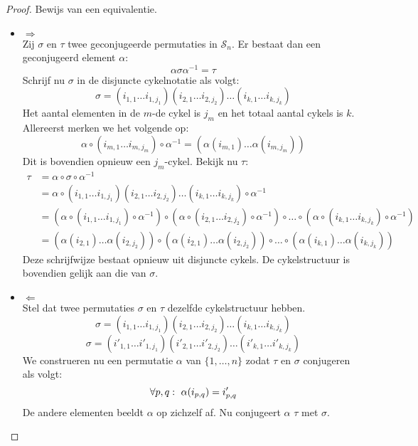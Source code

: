 \documentclass[main.tex]{subfiles}
\begin{document}
\begin{ei}
  \begin{proof}
    Bewijs van een equivalentie.
    \begin{itemize}
    \item $\Rightarrow$\\
      Zij $\sigma$ en $\tau$ twee geconjugeerde permutaties in $\mathcal{S}_{n}$.
      Er bestaat dan een geconjugeerd element $\alpha$:
      \[ \alpha \sigma \alpha^{-1} = \tau \]
      Schrijf nu $\sigma$ in de disjuncte cykelnotatie als volgt:
      \[ \sigma = (i_{1,1}\dotsc i_{1,j_{1}})(i_{2,1}\dotsc i_{2,j_{2}}) \dotsc (i_{k,1}\dotsc i_{k,j_{k}}) \]
      Het aantal elementen in de $m$-de cykel is $j_{m}$ en het totaal aantal cykels is $k$.
      Allereerst merken we het volgende op:
      \[ \alpha \circ (i_{m,1}\dotsc i_{m,j_{m}}) \circ \alpha^{-1} = (\alpha(i_{m,1})\dotsc\alpha(i_{m,j_{m}})) \]
      Dit is bovendien opnieuw een $j_{m}$-cykel.
      Bekijk nu $\tau$:
      \[ 
      \begin{array}{rl}
      \tau &= \alpha \circ \sigma \circ \alpha^{-1}\\
           &= \alpha \circ (i_{1,1}\dotsc i_{1,j_{1}})(i_{2,1}\dotsc i_{2,j_{2}}) \dotsc (i_{k,1}\dotsc i_{k,j_{k}}) \circ \alpha^{-1}\\
           &= (\alpha \circ (i_{1,1}\dotsc i_{1,j_{1}})\circ \alpha^{-1}) \circ (\alpha \circ(i_{2,1}\dotsc i_{2,j_{2}})\circ \alpha^{-1}) \circ \dotsc \circ (\alpha \circ(i_{k,1}\dotsc i_{k,j_{k}}) \circ \alpha^{-1})\\
           &= (\alpha(i_{2,1})\dotsc\alpha(i_{2,j_{2}})) \circ (\alpha(i_{2,1})\dotsc\alpha(i_{2,j_{2}})) \circ \dotsc \circ (\alpha(i_{k,1})\dotsc\alpha(i_{k,j_{k}}))
      \end{array}
      \]
      Deze schrijfwijze bestaat opnieuw uit disjuncte cykels.
      De cykelstructuur is bovendien gelijk aan die van $\sigma$.
    \item $\Leftarrow$\\
      Stel dat twee permutaties $\sigma$ en $\tau$ dezelfde cykelstructuur hebben.
      \[ \sigma = (i_{1,1}\dotsc i_{1,j_{1}})(i_{2,1}\dotsc i_{2,j_{2}}) \dotsc (i_{k,1}\dotsc i_{k,j_{k}}) \]
      \[ \sigma = (i'_{1,1}\dotsc i'_{1,j_{1}})(i'_{2,1}\dotsc i'_{2,j_{2}}) \dotsc (i'_{k,1}\dotsc i'_{k,j_{k}}) \]
      We construeren nu een permutatie $\alpha$ van $\{ 1,\dotsc,n \}$ zodat $\tau$ en $\sigma$ conjugeren als volgt:
      \[
        \forall p,q:\ \alpha(i_{p,q}) = i'_{p,q}\\
      \]
      De andere elementen beeldt $\alpha$ op zichzelf af.
      Nu conjugeert $\alpha$ $\tau$ met $\sigma$.
    \end{itemize}
  \end{proof}
\end{ei}
\end{document}
